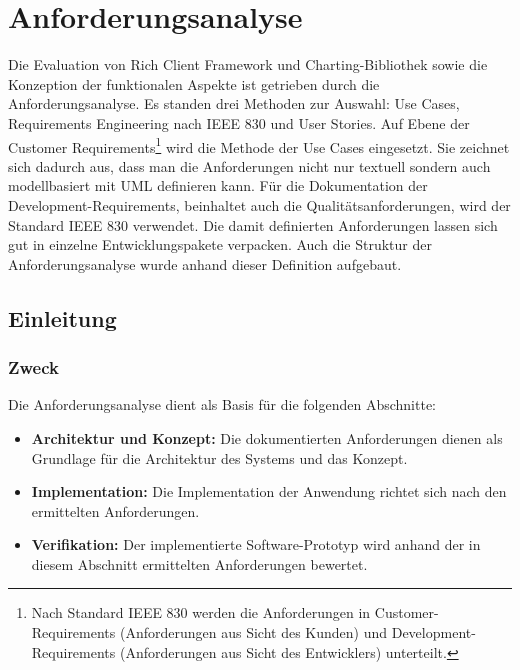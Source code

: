 \chapter{Anforderungsanalyse}\label{anforderungsanalyse}
Die Evaluation von Rich Client Framework und Charting-Bibliothek sowie die Konzeption der funktionalen Aspekte ist getrieben durch die Anforderungsanalyse. Es standen drei Methoden zur Auswahl: Use Cases, Requirements Engineering nach IEEE 830 und User Stories. Auf Ebene der Customer Requirements\footnote{Nach Standard IEEE 830\cite{ wiki:ieee830} werden die Anforderungen in Customer-Requirements (Anforderungen aus Sicht des Kunden) und Development-Requirements (Anforderungen aus Sicht des Entwicklers) unterteilt. } wird die Methode der Use Cases eingesetzt. Sie zeichnet sich dadurch aus, dass man die Anforderungen nicht nur textuell sondern auch modellbasiert mit UML definieren kann. Für die Dokumentation der Development-Requirements, beinhaltet auch die Qualitätsanforderungen, wird der Standard IEEE 830 verwendet. Die damit definierten Anforderungen lassen sich gut in einzelne Entwicklungspakete verpacken. Auch die Struktur der Anforderungsanalyse wurde anhand dieser Definition aufgebaut.


\section{Einleitung}
\subsection{Zweck}
Die Anforderungsanalyse dient als Basis für die folgenden Abschnitte:

\begin{itemize}
	\item \textbf{Architektur und Konzept:}  Die dokumentierten Anforderungen dienen als Grundlage für die Architektur des Systems und das Konzept. 
	\item \textbf{Implementation:} Die Implementation der Anwendung richtet sich nach den ermittelten Anforderungen. 
	\item \textbf{Verifikation:} Der implementierte Software-Prototyp wird anhand der in diesem Abschnitt ermittelten Anforderungen bewertet. 
\end{itemize}

